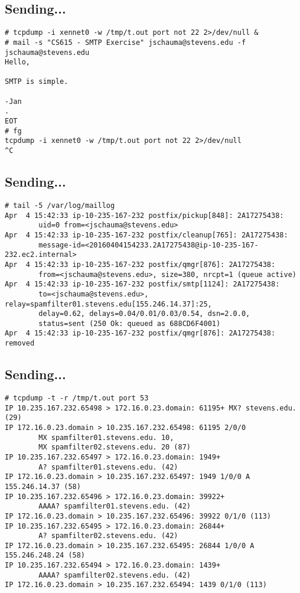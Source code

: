 \documentclass[xga]{xdvislides}
\begin{document}
\subsection{Sending...}
\begin{verbatim}
# tcpdump -i xennet0 -w /tmp/t.out port not 22 2>/dev/null &
# mail -s "CS615 - SMTP Exercise" jschauma@stevens.edu -f jschauma@stevens.edu
Hello,

SMTP is simple.

-Jan
.
EOT
# fg
tcpdump -i xennet0 -w /tmp/t.out port not 22 2>/dev/null
^C
\end{verbatim}


\subsection{Sending...}
\begin{verbatim}
# tail -5 /var/log/maillog
Apr  4 15:42:33 ip-10-235-167-232 postfix/pickup[848]: 2A17275438:
        uid=0 from=<jschauma@stevens.edu>
Apr  4 15:42:33 ip-10-235-167-232 postfix/cleanup[765]: 2A17275438:
        message-id=<20160404154233.2A17275438@ip-10-235-167-232.ec2.internal>
Apr  4 15:42:33 ip-10-235-167-232 postfix/qmgr[876]: 2A17275438:
        from=<jschauma@stevens.edu>, size=380, nrcpt=1 (queue active)
Apr  4 15:42:33 ip-10-235-167-232 postfix/smtp[1124]: 2A17275438:
        to=<jschauma@stevens.edu>, relay=spamfilter01.stevens.edu[155.246.14.37]:25,
        delay=0.62, delays=0.04/0.01/0.03/0.54, dsn=2.0.0,
        status=sent (250 Ok: queued as 688CD6F4001)
Apr  4 15:42:33 ip-10-235-167-232 postfix/qmgr[876]: 2A17275438: removed
\end{verbatim}

\subsection{Sending...}
\begin{verbatim}
# tcpdump -t -r /tmp/t.out port 53
IP 10.235.167.232.65498 > 172.16.0.23.domain: 61195+ MX? stevens.edu. (29)
IP 172.16.0.23.domain > 10.235.167.232.65498: 61195 2/0/0
        MX spamfilter01.stevens.edu. 10,
        MX spamfilter02.stevens.edu. 20 (87)
IP 10.235.167.232.65497 > 172.16.0.23.domain: 1949+
        A? spamfilter01.stevens.edu. (42)
IP 172.16.0.23.domain > 10.235.167.232.65497: 1949 1/0/0 A 155.246.14.37 (58)
IP 10.235.167.232.65496 > 172.16.0.23.domain: 39922+
        AAAA? spamfilter01.stevens.edu. (42)
IP 172.16.0.23.domain > 10.235.167.232.65496: 39922 0/1/0 (113)
IP 10.235.167.232.65495 > 172.16.0.23.domain: 26844+
        A? spamfilter02.stevens.edu. (42)
IP 172.16.0.23.domain > 10.235.167.232.65495: 26844 1/0/0 A 155.246.248.24 (58)
IP 10.235.167.232.65494 > 172.16.0.23.domain: 1439+
        AAAA? spamfilter02.stevens.edu. (42)
IP 172.16.0.23.domain > 10.235.167.232.65494: 1439 0/1/0 (113)
\end{verbatim}
\end{document}

